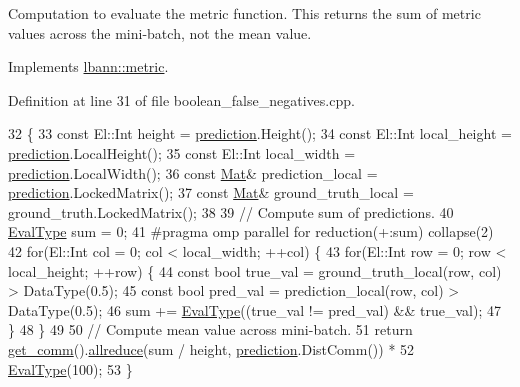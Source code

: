 Computation to evaluate the metric function. This returns the sum of metric values across the mini-\/batch, not the mean value. 

Implements \hyperlink{classlbann_1_1metric_aab79147ff480675db2e01d7a889a4296}{lbann\+::metric}.



Definition at line 31 of file boolean\+\_\+false\+\_\+negatives.\+cpp.


\begin{DoxyCode}
32                                                                 \{
33   \textcolor{keyword}{const} El::Int height = \hyperlink{base_8hpp_a2781a159088df64ed7d47cc91c4dc0a8ac41b9ec75e920b610e8907e066074b30}{prediction}.Height();
34   \textcolor{keyword}{const} El::Int local\_height = \hyperlink{base_8hpp_a2781a159088df64ed7d47cc91c4dc0a8ac41b9ec75e920b610e8907e066074b30}{prediction}.LocalHeight();
35   \textcolor{keyword}{const} El::Int local\_width = \hyperlink{base_8hpp_a2781a159088df64ed7d47cc91c4dc0a8ac41b9ec75e920b610e8907e066074b30}{prediction}.LocalWidth();
36   \textcolor{keyword}{const} \hyperlink{base_8hpp_a68f11fdc31b62516cb310831bbe54d73}{Mat}& prediction\_local = \hyperlink{base_8hpp_a2781a159088df64ed7d47cc91c4dc0a8ac41b9ec75e920b610e8907e066074b30}{prediction}.LockedMatrix();
37   \textcolor{keyword}{const} \hyperlink{base_8hpp_a68f11fdc31b62516cb310831bbe54d73}{Mat}& ground\_truth\_local = ground\_truth.LockedMatrix();
38 
39   \textcolor{comment}{// Compute sum of predictions.}
40   \hyperlink{base_8hpp_a3266f5ac18504bbadea983c109566867}{EvalType} sum = 0;
41 \textcolor{preprocessor}{  #pragma omp parallel for reduction(+:sum) collapse(2)}
42   \textcolor{keywordflow}{for}(El::Int col = 0; col < local\_width; ++col) \{
43     \textcolor{keywordflow}{for}(El::Int row = 0; row < local\_height; ++row) \{
44       \textcolor{keyword}{const} \textcolor{keywordtype}{bool} true\_val = ground\_truth\_local(row, col) > DataType(0.5);
45       \textcolor{keyword}{const} \textcolor{keywordtype}{bool} pred\_val = prediction\_local(row, col) > DataType(0.5);
46       sum += \hyperlink{base_8hpp_a3266f5ac18504bbadea983c109566867}{EvalType}((true\_val != pred\_val) && true\_val);
47     \}
48   \}
49   
50   \textcolor{comment}{// Compute mean value across mini-batch.}
51   \textcolor{keywordflow}{return} \hyperlink{classlbann_1_1metric_a464120720df6bfdf91bffe353e562964}{get\_comm}().\hyperlink{classlbann_1_1lbann__comm_af5631e5f0f54e4df4958eba9df2599ef}{allreduce}(sum / height, \hyperlink{base_8hpp_a2781a159088df64ed7d47cc91c4dc0a8ac41b9ec75e920b610e8907e066074b30}{prediction}.DistComm()) *
52     \hyperlink{base_8hpp_a3266f5ac18504bbadea983c109566867}{EvalType}(100);
53 \}
\end{DoxyCode}

